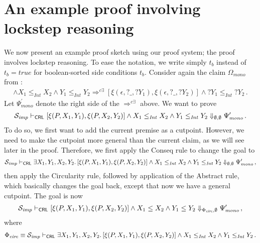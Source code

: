 \section{An example proof involving lockstep reasoning}\label{sec:example}

We now present an example proof sketch using our proof system; the proof involves lockstep reasoning.
To ease the notation, we write simply $t_b$ instead of $t_b = \mathit{true}$ for
boolean-sorted side conditions $t_b$.
Consider again the claim $\Omega_{\mathit{mono}}$ from :
\begin{align*}
  [\xi(P, X_1, Y_1),\xi(P, X_2, Y_2)] \land X_1 \leq_{\mathit{Int}} X_2 \land Y_1 \leq_{\mathit{Int}} Y_2
   \Rightarrow^{c\exists} [\xi(\epsilon, ?\_, ?Y_1), \xi(\epsilon, ?\_, ?Y_2)] \land ?Y_1 \leq_{\mathit{Int}} ?Y_2 \, .
\end{align*}
Let $\Psi^\prime_{\mathit{mono}}$ denote the right side of the $\Rightarrow^{c\exists}$ above.
We want to prove
\begin{align*}
  \mathcal{S}_{\mathit{imp}} \vdash_{\mathsf{CRL}} [\xi(P, X_1, Y_1),\xi(P, X_2, Y_2)] \land X_1 \leq_{\mathit{Int}} X_2 \land Y_1 \leq_{\mathit{Int}} Y_2
  \Downarrow_{\emptyset, \emptyset} \Psi^\prime_{\mathit{mono}} \, .
\end{align*}
To do so, we first want to add the current premise as a cutpoint.
However, we need to make the cutpoint more general than the current claim, as we will see later in the proof.
Therefore, we first apply the Conseq rule to change the goal to
\begin{align*}
  \mathcal{S}_{\mathit{imp}} \vdash_{\mathsf{CRL}} \exists X_1,Y_1,X_2,Y_2.\, [\xi(P, X_1, Y_1),\xi(P, X_2, Y_2)] \land X_1 \leq_{\mathit{Int}} X_2 \land Y_1 \leq_{\mathit{Int}} Y_2
  \Downarrow_{\emptyset, \emptyset} \Psi^\prime_{\mathit{mono}} \, ,
\end{align*}
then apply the Circularity rule, followed by application of the Abstract rule, which basically changes the goal
back, except that now we have a general cutpoint. The goal is now
\begin{align*}
  \mathcal{S}_{\mathit{imp}} \vdash_{\mathsf{CRL}} [\xi(P, X_1, Y_1),\xi(P, X_2, Y_2)] \land X_1 \leq X_2 \land Y_1 \leq Y_2
  \Downarrow_{\Phi_{\mathit{circ}}, \emptyset} \Psi^\prime_{\mathit{mono}} \, ,
\end{align*}
where
\begin{align*}
  \Phi_{\mathit{circ}} \equiv \mathcal{S}_{\mathit{imp}} \vdash_{\mathsf{CRL}} \exists X_1,Y_1,X_2,Y_2.\, [\xi(P, X_1, Y_1),\xi(P, X_2, Y_2)] \land X_1 \leq_{\mathit{Int}} X_2 \land Y_1 \leq_{\mathit{Int}} Y_2 \, .
\end{align*}

